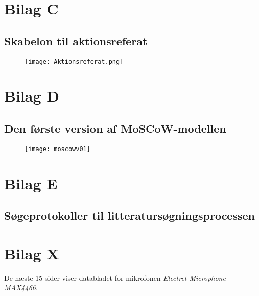 \newpage

\section{Bilag C}
\subsection{Skabelon til aktionsreferat}
\label{App:skabelonak}
\begin{figure}[htb]
\centering
\texttt{[image: Aktionsreferat.png]}	
\end{figure}

\newpage

\section{Bilag D}
\subsection{Den første version af MoSCoW-modellen}
\label{App:moscowv01}
\begin{figure}[htb]
\centering
\texttt{[image: moscowv01]}	
\end{figure}

\newpage

\section{Bilag E}
\subsection{Søgeprotokoller til litteratursøgningsprocessen}
\label{App:sogeprotokol}

\newpage
\section{Bilag X}
De næste 15 sider viser databladet for mikrofonen \textit{Electret Microphone MAX4466}. 



 